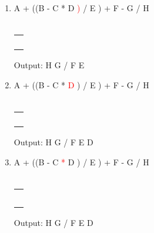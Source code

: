 \documentclass[a4paper]{article}
\begin{document}
\begin{large}
\begin{enumerate}
          \renewcommand{\arraystretch}{1.3} \item
          A + ((B - C * D \textcolor{red}{)} / E ) + F - G / H\\\\
          \begin{tabular}[t]{ | p{1em} | }
            \makecell{)} \\ \hline
            \makecell{/} \\ \hline
            \makecell{)} \\ \hline
            \makecell{+} \\\hline
            \makecell{-} \\\hline
          \end{tabular}
          \hspace{2em}
          Output: H G / F E

          \newpage

          \renewcommand{\arraystretch}{1.3} \item
          A + ((B - C *  \textcolor{red}{D} ) / E ) + F - G / H\\\\
          \begin{tabular}[t]{ | p{1em} | }
            \makecell{)} \\ \hline
            \makecell{/} \\ \hline
            \makecell{)} \\ \hline
            \makecell{+} \\\hline
            \makecell{-} \\\hline
          \end{tabular}
          \hspace{2em}
          Output: H G / F E D

          \renewcommand{\arraystretch}{1.3} \item
          A + ((B - C  \textcolor{red}{*} D ) / E ) + F - G / H\\\\
          \begin{tabular}[t]{ | p{1em} | }
            \makecell{*} \\ \hline
            \makecell{)} \\ \hline
            \makecell{/} \\ \hline
            \makecell{)} \\ \hline
            \makecell{+} \\\hline
            \makecell{-} \\\hline
          \end{tabular}
          \hspace{2em}
          Output: H G / F E D


\end{enumerate}
\end{large}
\end{document}
